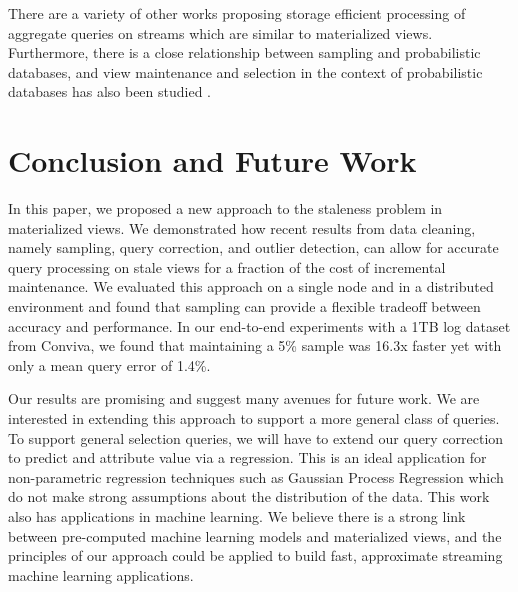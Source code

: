 There are a variety of other works proposing storage efficient processing of aggregate queries on streams \cite{dobra2002processing, greenwald2001space} which are similar to materialized views. Furthermore, there is a close relationship between sampling and probabilistic databases, and view maintenance and selection in the context of probabilistic databases has also been studied \cite{re2007materialized}.

\section{Conclusion and Future Work}\label{conclusion}
In this paper, we proposed a new approach to the staleness problem in materialized views.
We demonstrated how recent results from data cleaning, namely sampling, query correction, and outlier detection, can
allow for accurate query processing on stale views for a fraction of the cost of incremental maintenance. 
We evaluated this approach on a single node and in a distributed environment and found that sampling can provide a flexible tradeoff 
between accuracy and performance.
In our end-to-end experiments with a 1TB log dataset from Conviva, we found that maintaining a 5\% sample was 16.3x faster yet  with only a mean query error of 1.4\%.

Our results are promising and suggest many avenues for future work.
We are interested in extending this approach to support a more general class of queries.
To support general selection queries, we will have to extend our query correction to predict and attribute value via a regression.
This is an ideal application for non-parametric regression techniques such as Gaussian Process Regression which do
not make strong assumptions about the distribution of the data.
This work also has applications in machine learning.
We believe there is a strong link between pre-computed machine learning models and materialized views, and the principles of our approach could be applied
to build fast, approximate streaming machine learning applications.



